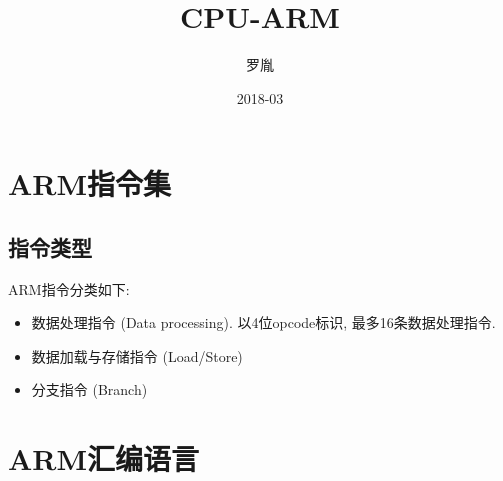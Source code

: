 \documentclass[10pt]{book}
\begin{document}


\newcommand{\red}[1]{\textcolor[rgb]{1.0, 0.0, 0.0}{#1}}
\newcommand{\green}[1]{\textcolor[rgb]{0.0, 1.0, 0.0}{#1}}
\newcommand{\blue}[1]{\textcolor[rgb]{0.0, 0.0, 1.0}{#1}}
\newcommand{\greenblue}[1]{\textcolor[rgb]{0.0, 1.0, 1.0}{#1}}
\newcommand{\redB}[1]{\textcolor[rgb]{1.0, 0.0, 0.0}{\textbf{#1}}}
\newcommand{\greenB}[1]{\textcolor[rgb]{0.0, 1.0, 0.0}{\textbf{#1}}}
\newcommand{\blueB}[1]{\textcolor[rgb]{0.0, 0.0, 1.0}{\textbf{#1}}}
\newcommand{\greenblueB}[1]{\textcolor[rgb]{0.0, 1.0, 1.0}{\textbf{#1}}}
\newcommand{\mypath}[1]{/home/luoyin/Notes2016/ECG_Analysis/{#1}/}

\title{CPU-ARM}
\author{罗胤}
\date{2018-03}
\maketitle

\tableofcontents

\chapter{ARM指令集}
\section{指令类型}
ARM指令分类如下:
\begin{itemize}
  \item 数据处理指令 (Data processing). 以4位opcode标识, 最多16条数据处理指令.
  \item 数据加载与存储指令 (Load/Store)
  \item 分支指令 (Branch)
\end{itemize}

\chapter{ARM汇编语言}
\end{document}
